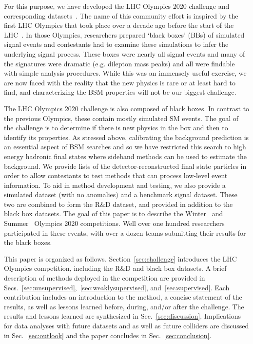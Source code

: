 \documentclass[a4paper,11pt]{article}
\begin{document}
For this purpose, we have developed the LHC Olympics 2020 challenge and corresponding datasets~\cite{lhco}.  The name of this community effort is inspired by the first LHC Olympics that took place over a decade ago before the start of the LHC~\cite{lhco_old1,lhco_old2,lhco_old3,lhco_old4}.   In those Olympics, researchers prepared `black boxes' (BBs) of simulated signal events and contestants had to examine these simulations to infer the underlying signal process.  These boxes were nearly all signal events and many of the signatures were dramatic (e.g. dilepton mass peaks) and all were findable with simple analysis procedures.  While this was an immensely useful exercise, we are now faced with the reality that the new physics is rare or at least hard to find, and characterizing the BSM properties will not be our biggest challenge.

The LHC Olympics 2020 challenge is also composed of black boxes.  In contrast to the previous Olympics, these contain mostly simulated SM events.  The goal of the challenge is to determine if there is new physics in the box and then to identify its properties. As stressed above, calibrating the background prediction is an essential aspect of BSM searches and so we have restricted this search to high energy hadronic final states where sideband methods can be used to estimate the background.  We provide lists of the detector-reconstructed final state particles
in order to allow contestants to test methods that can process low-level event information.  To aid in method development and testing, we also provide a simulated dataset (with no anomalies) and a benchmark signal dataset. These two are combined to form the R\&D dataset, and provided in addition to the black box datasets.  The goal of this paper is to describe the Winter~\cite{winterolympics} and Summer~\cite{summerolympics} Olympics 2020 competitions.  Well over one hundred researchers participated in these events, with over a dozen teams submitting their results for the black boxes.

This paper is organized as follows.  Section~\ref{sec:challenge} introduces the LHC Olympics competition, including the R\&D and black box datasets.  A brief description of methods deployed in the competition are provided in Secs.~\ref{sec:unsupervised},~\ref{sec:weaklysupervised}, and~\ref{sec:supervised}.  Each contribution includes an introduction to the method, a concise statement of the results, as well as lessons learned before, during, and/or after the challenge.   The results and lessons learned are synthesized in Sec.~\ref{sec:discussion}.  Implications for data analyses with future datasets and as well as future colliders are discussed in Sec.~\ref{sec:outlook} and the paper concludes in Sec.~\ref{sec:conclusion}. 
\end{document}
